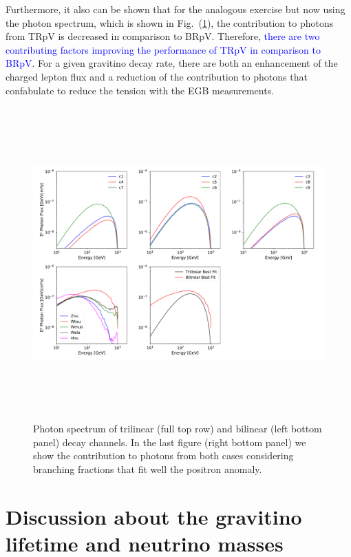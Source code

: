 \documentclass[a4paper,11pt]{article}
\newcommand*{\blue}{\textcolor{blue}}
\begin{document}
Furthermore, it also can be shown that for the analogous exercise but now using the photon spectrum, which is shown in Fig.~(\ref{fig:photon-spectrum}), the contribution to photons from TRpV is decreased in comparison to BRpV. Therefore, \blue{there are two contributing factors improving the performance of TRpV in comparison to BRpV}. For a given gravitino decay rate, there are both an enhancement of the charged lepton flux and a reduction of the contribution to photons that confabulate to reduce the tension with the EGB measurements.

\begin{figure}[htb]
\begin{center}
\includegraphics[height=12cm,width=16cm,angle=0]{Figures/exp_plots_gamma_rays_EGB_comparison.pdf}
\caption{Photon spectrum of trilinear (full top row) and bilinear (left bottom panel) decay channels. In the last figure (right bottom panel) we show the contribution to photons from both cases considering branching fractions that fit well the positron anomaly.}
\label{fig:photon-spectrum}
\end{center}
\end{figure}

\section{Discussion about the gravitino lifetime and neutrino masses}
\label{sec:lifetime-neutrinomasses}
\end{document}

